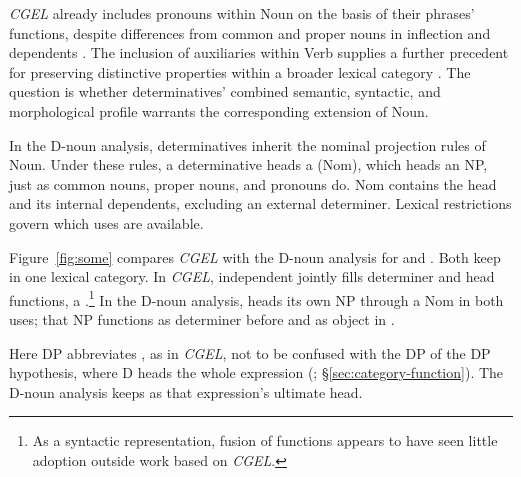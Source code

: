 \documentclass[12pt]{article}
\begin{document}
\textit{CGEL} already includes pronouns within Noun on the basis of their phrases' functions, despite differences from common and proper nouns in inflection and dependents \citep[327--328]{huddleston2002}. The inclusion of auxiliaries within Verb supplies a further precedent for preserving distinctive properties within a broader lexical category \citep{pullumwilson1977}. The question is whether determinatives' combined semantic, syntactic, and morphological profile warrants the corresponding extension of Noun.

In the D-noun analysis, determinatives inherit the nominal projection rules of Noun. Under these rules, a determinative heads a  (Nom), which heads an NP, just as common nouns, proper nouns, and pronouns do. Nom contains the head and its internal dependents, excluding an external determiner. Lexical restrictions govern which uses are available.

Figure~\ref{fig:some} compares \textit{CGEL} with the D-noun analysis for  and . Both keep  in one lexical category. In \textit{CGEL}, independent  jointly fills determiner and head functions, a  \citep[410--412]{huddleston2002}.\footnote{As a syntactic representation, fusion of functions appears to have seen little adoption outside work based on \textit{CGEL}.} In the D-noun analysis,  heads its own NP through a Nom in both uses; that NP functions as determiner before  and as object in .

Here DP abbreviates , as in \textit{CGEL}, not to be confused with the DP of the DP hypothesis, where D heads the whole expression  (\citealp{abney1987}; §\ref{sec:category-function}). The D-noun analysis keeps  as that expression's ultimate head.
\end{document}
